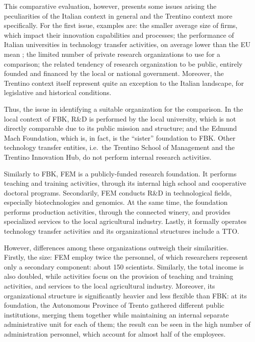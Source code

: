 This comparative evaluation, however, presents some issues arising the peculiarities of the Italian context in general and the Trentino context more specifically. For the first issue, examples are: the smaller average size of firms, which impact their innovation capabilities and processes; the performance of Italian universities in technology transfer activities, on average lower than the EU mean \citep{Balderi2007}; the limited number of private research organizations to use for a comparison; the related tendency of research organization to be public, entirely founded and financed by the local or national government. Moreover, the Trentino context itself  represent quite an exception to the Italian landscape, for legislative and historical conditions. 

Thus, the issue in identifying a suitable organization for the comparison. In the local context of FBK, R\&D is performed by the local university, which is not directly comparable due to its public mission and structure; and the Edmund Mach Foundation, which is, in fact, is the \enquote{sister} foundation to FBK. Other technology transfer entities, i.e.\ the Trentino School of Management and the Trentino Innovation Hub, do not perform internal research activities.

Similarly to FBK, FEM is a publicly-funded research foundation. It performs teaching and training activities, through its internal high school and cooperative doctoral programs. Secondarily, FEM conducts R\&D in technological fields, especially  biotechnologies and genomics. At the same time, the foundation performs production activities, through the connected winery, and provides specialized services to the local agricultural industry. Lastly, it formally operates technology transfer activities and its organizational structures include a TTO.

However, differences among these organizations outweigh their similarities. Firstly, the size: FEM employ twice the  personnel, of which researchers represent only a secondary component: about 150 scientists. Similarly, the total income is also doubled, while activities focus on the provision of teaching and training activities, and services to the local agricultural industry. Moreover, its organizational structure is significantly heavier and less flexible than FBK: at its foundation, the Autonomous Province of Trento gathered different public institutions, merging them together while maintaining an internal separate administrative unit for each of them; the result can be seen in the high number of administration personnel, which account for almost half of the employees. 

